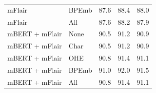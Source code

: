 \documentclass[12pt,a4paper,]{book}
\begin{document}
\begin{longtable}[t]{llrrr}
\hspace{1em}mFlair & BPEmb & 87.6 & 88.4 & 88.0\\
\hspace{1em}mFlair & All & 87.6 & 88.2 & 87.9\\
\hspace{1em}mBERT + mFlair & None & 90.5 & 91.2 & 90.9\\
\hspace{1em}mBERT + mFlair & Char & 90.5 & 91.2 & 90.9\\
\hspace{1em}mBERT + mFlair & OHE & 90.8 & 91.4 & 91.1\\
\hspace{1em}mBERT + mFlair & BPEmb & 91.0 & 92.0 & 91.5\\
\hspace{1em}mBERT + mFlair & All & 90.8 & 91.4 & 91.1\\*
\end{longtable}
\endgroup{}

\newpage

\begingroup\fontsize{10}{12}\selectfont
\end{document}
